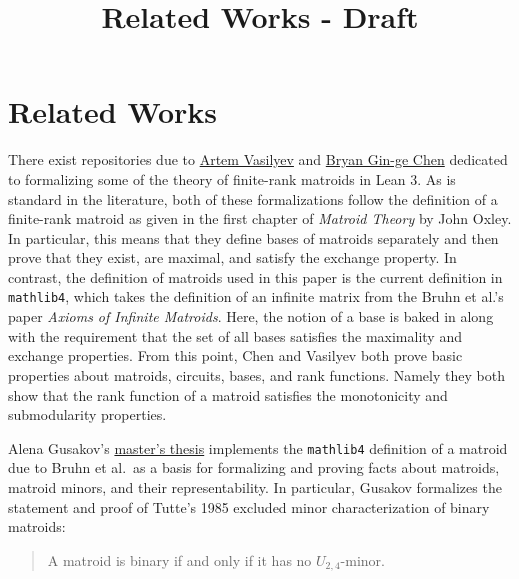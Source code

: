 \documentclass[sigplan,10pt,anonymous,review]{acmart}
\title{Related Works - Draft}
\begin{document}
	\maketitle


	\section{Related Works}
	There exist repositories due to \href{https://github.com/VArtem/lean-matroids}{Artem Vasilyev} and \href{https://github.com/bryangingechen/lean-matroids}{Bryan Gin-ge Chen}
	dedicated to formalizing some of the theory of finite-rank matroids in Lean 3. As is standard in the literature, both of these formalizations follow the definition of a
	finite-rank matroid as given in the first chapter of \textit{Matroid Theory} by John Oxley. %
	In particular, this means that they define bases of matroids separately and then prove that they exist, are maximal, and satisfy the exchange property.
	In contrast, the definition of matroids used in this paper is the current definition in \texttt{mathlib4}, which takes the definition of an infinite matrix from the
	Bruhn et al.'s paper \textit{Axioms of Infinite Matroids}. Here, the notion of a base is baked in along with the requirement that the set of all bases satisfies the
	maximality and exchange properties. From this point, Chen and Vasilyev both prove basic properties about matroids, circuits, bases, and rank functions.
	Namely they both show that the rank function of a matroid satisfies the monotonicity and submodularity properties.

	Alena Gusakov's \href{https://dspacemainprd01.lib.uwaterloo.ca/server/api/core/bitstreams/fe5957ef-3e10-4493-b11d-8d8121cafeba/content}{master's thesis}
	implements the \texttt{mathlib4} definition of a matroid due to Bruhn et al.\ as a basis for formalizing and proving facts about matroids,
	matroid minors, and their representability. In particular, Gusakov formalizes the statement and proof of Tutte's 1985 excluded minor characterization of binary matroids:
	\begin{quote}
		A matroid is binary if and only if it has no $U_{2,4}$-minor.
	\end{quote}
\end{document}
